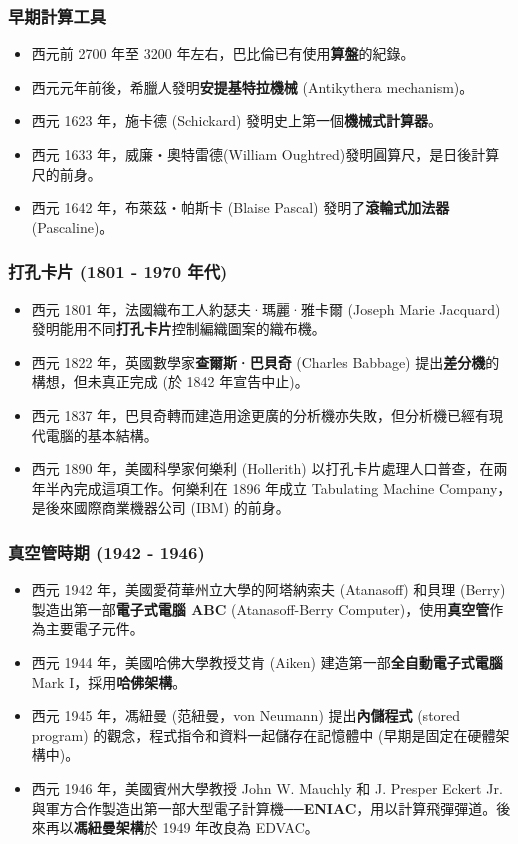 \documentclass[12pt,a4paper,oneside]{report}
\begin{document}
\begin{CJK}{UTF8}{bkai}
\subsubsection{早期計算工具}
\begin{itemize}
\item 西元前 2700 年至 3200 年左右，巴比倫已有使用\textbf{算盤}的紀錄。
\item 西元元年前後，希臘人發明\textbf{安提基特拉機械} (Antikythera mechanism)。
\item 西元 1623 年，施卡德 (Schickard) 發明史上第一個\textbf{機械式計算器}。
\item 西元 1633 年，威廉‧奧特雷德(William Oughtred)發明圓算尺，是日後計算尺的前身。
\item 西元 1642 年，布萊茲‧帕斯卡 (Blaise Pascal) 發明了\textbf{滾輪式加法器} (Pascaline)。
\end{itemize}

\subsubsection{打孔卡片 (1801 - 1970 年代)}
\begin{itemize}
\item 西元 1801 年，法國織布工人約瑟夫·瑪麗·雅卡爾 (Joseph Marie Jacquard) 發明能用不同\textbf{打孔卡片}控制編織圖案的織布機。
\item 西元 1822 年，英國數學家\textbf{查爾斯·巴貝奇} (Charles Babbage) 提出\textbf{差分機}的構想，但未真正完成 (於 1842 年宣告中止)。
\item 西元 1837 年，巴貝奇轉而建造用途更廣的分析機亦失敗，但分析機已經有現代電腦的基本結構。
\item 西元 1890 年，美國科學家何樂利 (Hollerith) 以打孔卡片處理人口普查，在兩年半內完成這項工作。何樂利在 1896 年成立 Tabulating Machine Company，是後來國際商業機器公司 (IBM) 的前身。
\end{itemize}

\subsubsection{真空管時期 (1942 - 1946)}
\begin{itemize}
\item 西元 1942 年，美國愛荷華州立大學的阿塔納索夫 (Atanasoff) 和貝理 (Berry) 製造出第一部\textbf{電子式電腦 ABC} (Atanasoff-Berry Computer)，使用\textbf{真空管}作為主要電子元件。
\item 西元 1944 年，美國哈佛大學教授艾肯 (Aiken) 建造第一部\textbf{全自動電子式電腦} Mark I，採用\textbf{哈佛架構}。
\item 西元 1945 年，馮紐曼 (范紐曼，von Neumann) 提出\textbf{內儲程式} (stored program) 的觀念，程式指令和資料一起儲存在記憶體中 (早期是固定在硬體架構中)。
\item 西元 1946 年，美國賓州大學教授 John W. Mauchly 和 J. Presper Eckert Jr. 與軍方合作製造出第一部大型電子計算機──\textbf{ENIAC}，用以計算飛彈彈道。後來再以\textbf{馮紐曼架構}於 1949 年改良為 EDVAC。
\end{itemize}


\end{CJK}
\end{document}
